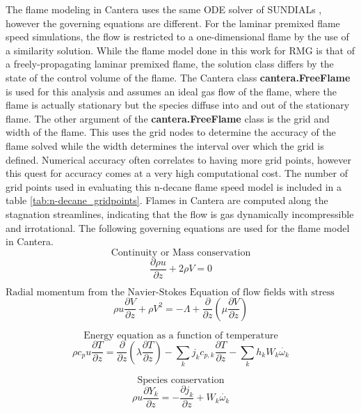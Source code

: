 The flame modeling in Cantera uses the same ODE solver of SUNDIALs \cite{hindmarsh2005sundials}, however the governing equations are different. For the laminar premixed flame speed simulations, the flow is restricted to a one-dimensional flame by the use of a similarity solution. While the flame model done in this work for RMG is that of a freely-propagating laminar premixed flame, the solution class differs by the state of the control volume of the flame. The Cantera class \textbf{cantera.FreeFlame} is used for this analysis and assumes an ideal gas flow of the flame, where the flame is actually stationary but the species diffuse into and out of the stationary flame. The other argument of the \textbf{cantera.FreeFlame} class is the grid and width of the flame. This uses the grid nodes to determine the accuracy of the flame solved while the width determines the interval over which the grid is defined. Numerical accuracy often correlates to having more grid points, however this quest for accuracy comes at a very high computational cost. The number of grid points used in evaluating this n-decane flame speed model is included in a table \ref{tab:n-decane_gridpoints}. Flames in Cantera are computed along the stagnation streamlines, indicating that the flow is gas dynamically incompressible and irrotational. The following governing equations are used for the flame model in Cantera.
\[\text{Continuity or Mass conservation}\]
\begin{equation}
    \frac{\partial \rho u}{\partial z} + 2\rho V = 0
\end{equation}

\[\text{Radial momentum from the Navier-Stokes Equation of flow fields with stress tensor}\]
\begin{equation}
    \rho u\frac{\partial V}{\partial z} + \rho V^2 = -\Lambda + \frac{\partial}{\partial z}(\mu \frac{\partial V}{\partial z})
\end{equation}

\[\text{Energy equation as a function of temperature}\]
\begin{equation}
    \rho c_p u\frac{\partial T}{\partial z}=\frac{\partial}{\partial z}(\lambda \frac{\partial T}{\partial z})-\sum_k{j_k c_{p,k}\frac{\partial T}{\partial z}} - \sum_k{h_k W_k\Dot{\omega_k}}
\end{equation}

\[\text{Species conservation}\]
\begin{equation}
    \rho u\frac{\partial Y_k}{\partial z}=-\frac{\partial j_k}{\partial z} + W_k\Dot{\omega_k}
\end{equation}

